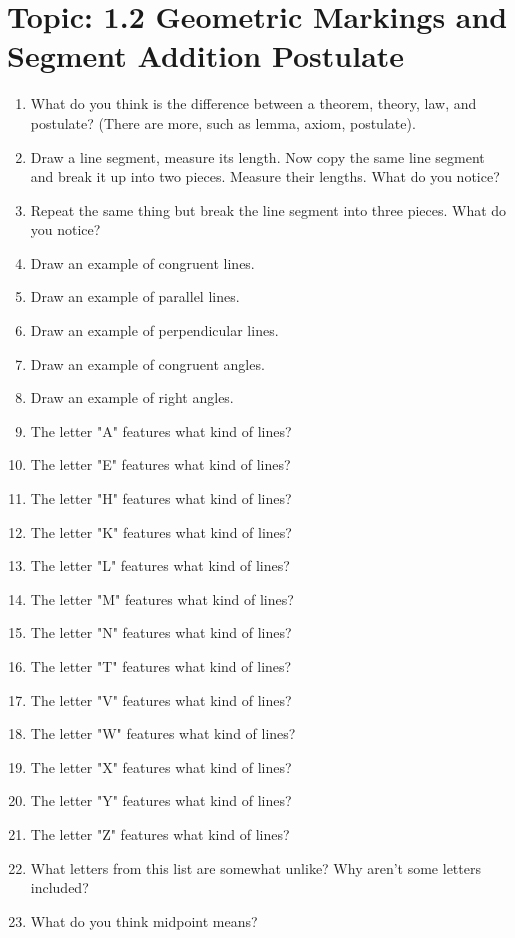 \documentclass[12pt,letterpaper]{article}
\begin{document}
\section*{Topic: 1.2 Geometric Markings and Segment Addition Postulate}
\begin{enumerate}
    \item What do you think is the difference between a theorem, theory, law, and postulate? (There are more, such as lemma, axiom, postulate).
    \item Draw a line segment, measure its length. Now copy the same line segment and break it up into two pieces. Measure their lengths. What do you notice?
    \item Repeat the same thing but break the line segment into three pieces. What do you notice?
    \item Draw an example of congruent lines.
    \item Draw an example of parallel lines.
    \item Draw an example of perpendicular lines.
    \item Draw an example of congruent angles.
    \item Draw an example of right angles.
    \item The letter "A" features what kind of lines?
    \item The letter "E" features what kind of lines?
    \item The letter "H" features what kind of lines?
    \item The letter "K" features what kind of lines?
    \item The letter "L" features what kind of lines?
    \item The letter "M" features what kind of lines?
    \item The letter "N" features what kind of lines?
    \item The letter "T" features what kind of lines?
    \item The letter "V" features what kind of lines?
    \item The letter "W" features what kind of lines?
    \item The letter "X" features what kind of lines?
    \item The letter "Y" features what kind of lines?
    \item The letter "Z" features what kind of lines?
    \item What letters from this list are somewhat unlike? Why aren't some letters included?
    \item What do you think midpoint means?
\end{enumerate}
\end{document}
